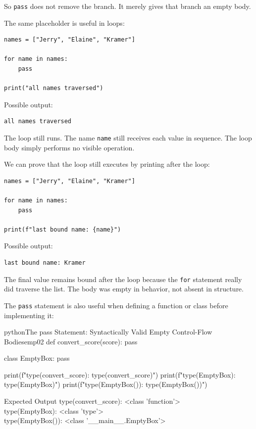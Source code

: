 \documentclass[a4paper,twoside]{report}
\begin{document}
So \texttt{pass} does not remove the branch. It merely gives that branch an empty body.

The same placeholder is useful in loops:

\begin{verbatim}
names = ["Jerry", "Elaine", "Kramer"]

for name in names:
    pass

print("all names traversed")
\end{verbatim}

Possible output:

\begin{verbatim}
all names traversed
\end{verbatim}

The loop still runs. The name \texttt{name} still receives each value in sequence. The loop body simply performs no visible operation.

We can prove that the loop still executes by printing after the loop:

\begin{verbatim}
names = ["Jerry", "Elaine", "Kramer"]

for name in names:
    pass

print(f"last bound name: {name}")
\end{verbatim}

Possible output:

\begin{verbatim}
last bound name: Kramer
\end{verbatim}

The final value remains bound after the loop because the \texttt{for} statement really did traverse the list. The body was empty in behavior, not absent in structure.

The \texttt{pass} statement is also useful when defining a function or class before implementing it:

\begin{codebox}[]{python}{The pass Statement: Syntactically Valid Empty Control-Flow Bodies}{emp02}
def convert_score(score):
    pass

class EmptyBox:
    pass

print(f"type(convert_score): {type(convert_score)}")
print(f"type(EmptyBox): {type(EmptyBox)}")
print(f"type(EmptyBox()): {type(EmptyBox())}")
\end{codebox}


\begin{iobox}{Expected Output}
type(convert\_score): <class 'function'> \\
type(EmptyBox): <class 'type'> \\
type(EmptyBox()): <class '\_\_main\_\_.EmptyBox'> \\
\end{iobox}
\end{document}
